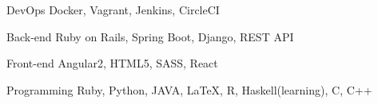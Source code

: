 

\begin{cvskills}

  \cvskill
    {DevOps} %
    { Docker, Vagrant, Jenkins, CircleCI} %

  \cvskill
    {Back-end} %
    {Ruby on Rails, Spring Boot, Django, REST API} %

  \cvskill
    {Front-end} %
    {Angular2, HTML5, SASS, React} %

  \cvskill
    {Programming} %
    {Ruby, Python, JAVA, LaTeX, R, Haskell(learning), C, C++} %


\end{cvskills}
